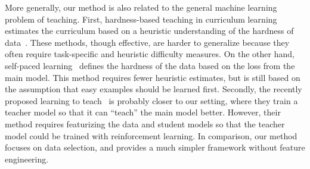 More generally, our method is also related to the general machine learning problem of teaching. First, hardness-based teaching in curriculum learning estimates the curriculum based on a heuristic understanding of the hardness of data~\citep{cl_bengio,automate_cl_GravesBMMK17,SpitkovskyAJ10,zhang2016boosting,zhang2018empirical,platanios19naacl,baysian_curriculum}. These methods, though effective, are harder to generalize because they often require task-specific and heuristic difficulty measures. On the other hand, self-paced learning~\citep{spl_visual_category,spl_kumar,spl_visual_category} defines the hardness of the data based on the loss from the main model. This method requires fewer heuristic estimates, but is still based on the assumption that easy examples should be learned first. Secondly, the recently proposed learning to teach~\citep{learn_to_teach} is probably closer to our setting, where they train a teacher model so that it can ``teach'' the main model better. However, their method requires featurizing the data and student models so that the teacher model could be trained with reinforcement learning. In comparison, our method focuses on data selection, and provides a much simpler framework without feature engineering. 










